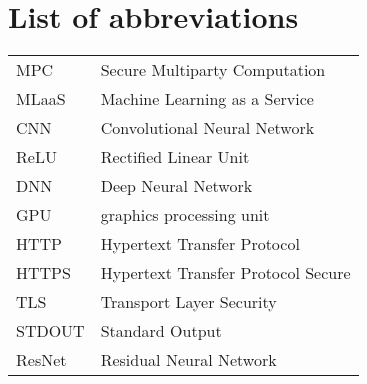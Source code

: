 \chapter*{List of abbreviations}
\begin{table}[!h]
	\begin{tabular}{ll}
		MPC			&	Secure Multiparty Computation\\
		MLaaS		&	Machine Learning as a Service\\
		CNN			&	Convolutional Neural Network\\
		ReLU		&	Rectified Linear Unit\\
		DNN 		&	Deep Neural Network\\
		GPU 		&	graphics processing unit\\
		HTTP		&	Hypertext Transfer Protocol\\
		HTTPS		&	Hypertext Transfer Protocol Secure\\
		TLS			&	Transport Layer Security\\
		STDOUT	&	Standard Output\\
		ResNet	&	Residual Neural Network
	\end{tabular}
\end{table}
